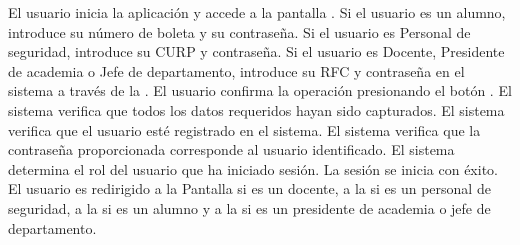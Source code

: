 \begin{UCtrayectoria}
	\UCpaso[\UCactor] El usuario inicia la aplicación y accede a la pantalla .
	\UCpaso[\UCactor] Si el usuario es un alumno, introduce su número de boleta y su contraseña. Si el usuario es Personal de seguridad, introduce su CURP y contraseña. Si el usuario es Docente, Presidente de academia o Jefe de departamento, introduce su RFC y contraseña en el sistema a través de la \label{CU01.introduceDatos}.
	\UCpaso[\UCactor] El usuario confirma la operación presionando el botón .
	\UCpaso El sistema verifica que todos los datos requeridos hayan sido capturados.
	\UCpaso El sistema verifica que el usuario esté registrado en el sistema.
	\UCpaso El sistema verifica que la contraseña proporcionada corresponde al usuario identificado.
	\UCpaso El sistema determina el rol del usuario que ha iniciado sesión.
	\UCpaso La sesión se inicia con éxito.
	\UCpaso El usuario es redirigido a la {Pantalla  si es un docente, a la  si es un personal de seguridad, a la  si es un alumno y a la  si es un presidente de academia o jefe de departamento}.
\end{UCtrayectoria}




